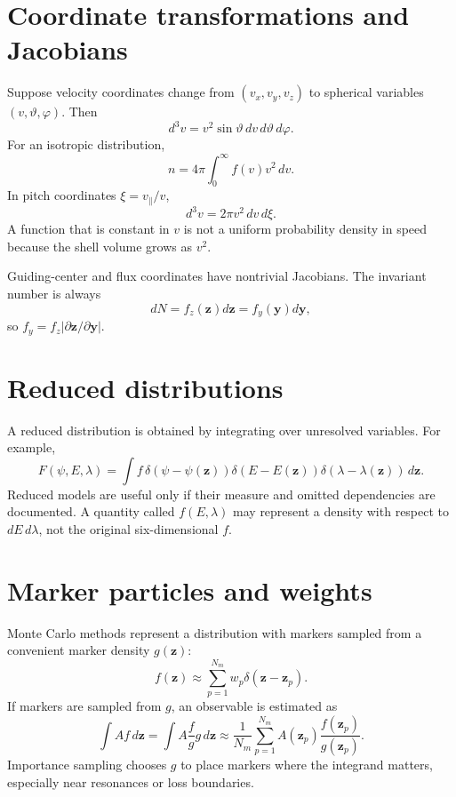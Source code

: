 \documentclass[11pt]{article}
\begin{document}
\section{Coordinate transformations and Jacobians}
Suppose velocity coordinates change from $(v_x,v_y,v_z)$ to spherical variables $(v,\vartheta,\varphi)$. Then
\begin{equation}
d^3v=v^2\sin\vartheta\,dv\,d\vartheta\,d\varphi.
\end{equation}
For an isotropic distribution,
\begin{equation}
n=4\pi\int_0^\infty f(v)v^2\,dv.
\end{equation}
In pitch coordinates $\xi=v_\parallel/v$,
\begin{equation}
d^3v=2\pi v^2\,dv\,d\xi.
\end{equation}
A function that is constant in $v$ is not a uniform probability density in speed because the shell volume grows as $v^2$.

Guiding-center and flux coordinates have nontrivial Jacobians. The invariant number is always
\begin{equation}
dN=f_z(\mathbf z)d\mathbf z=f_y(\mathbf y)d\mathbf y,
\end{equation}
so $f_y=f_z\left|\partial\mathbf z/\partial\mathbf y\right|$.

\section{Reduced distributions}
A reduced distribution is obtained by integrating over unresolved variables. For example,
\begin{equation}
F(\psi,E,\lambda)=\int f\,
\delta(\psi-\psi(\mathbf z))
\delta(E-E(\mathbf z))
\delta(\lambda-\lambda(\mathbf z))\,d\mathbf z.
\end{equation}
Reduced models are useful only if their measure and omitted dependencies are documented. A quantity called $f(E,\lambda)$ may represent a density with respect to $dE\,d\lambda$, not the original six-dimensional $f$.

\section{Marker particles and weights}
Monte Carlo methods represent a distribution with markers sampled from a convenient marker density $g(\mathbf z)$:
\begin{equation}
f(\mathbf z)\approx\sum_{p=1}^{N_m}w_p\delta(\mathbf z-\mathbf z_p).
\end{equation}
If markers are sampled from $g$, an observable is estimated as
\begin{equation}
\int A f\,d\mathbf z
=\int A\frac{f}{g}g\,d\mathbf z
\approx\frac{1}{N_m}\sum_{p=1}^{N_m}A(\mathbf z_p)\frac{f(\mathbf z_p)}{g(\mathbf z_p)}.
\end{equation}
Importance sampling chooses $g$ to place markers where the integrand matters, especially near resonances or loss boundaries.
\end{document}
